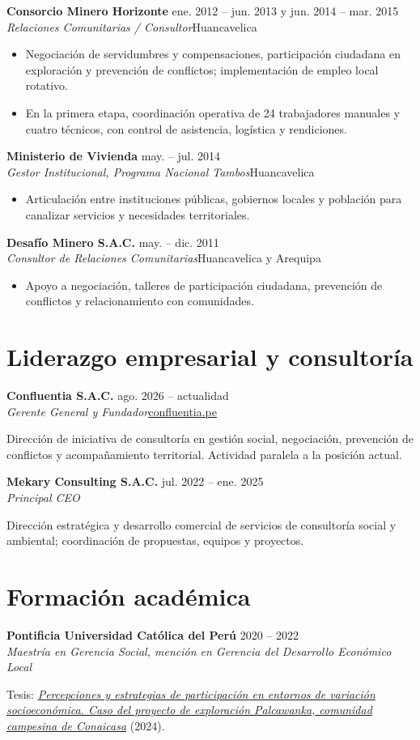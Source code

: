\documentclass[10pt,a4paper]{article}
\newcommand{\trabajo}[4]{%
  \vspace{5pt}\textbf{#1} \hfill {\small\color{muted}#3}\\
  {\color{teal}\itshape #2}\hfill{\small\color{muted}#4}\par\vspace{1pt}}
\begin{document}
\trabajo{Consorcio Minero Horizonte}{Relaciones Comunitarias / Consultor}{ene. 2012 – jun. 2013 y jun. 2014 – mar. 2015}{Huancavelica}
\begin{itemize}
  \item Negociación de servidumbres y compensaciones, participación ciudadana en exploración y prevención de conflictos; implementación de empleo local rotativo.
  \item En la primera etapa, coordinación operativa de 24 trabajadores manuales y cuatro técnicos, con control de asistencia, logística y rendiciones.
\end{itemize}

\trabajo{Ministerio de Vivienda}{Gestor Institucional, Programa Nacional Tambos}{may. – jul. 2014}{Huancavelica}
\begin{itemize}
  \item Articulación entre instituciones públicas, gobiernos locales y población para canalizar servicios y necesidades territoriales.
\end{itemize}

\trabajo{Desafío Minero S.A.C.}{Consultor de Relaciones Comunitarias}{may. – dic. 2011}{Huancavelica y Arequipa}
\begin{itemize}
  \item Apoyo a negociación, talleres de participación ciudadana, prevención de conflictos y relacionamiento con comunidades.
\end{itemize}

\section{Liderazgo empresarial y consultoría}
\trabajo{Confluentia S.A.C.}{Gerente General y Fundador}{ago. 2026 – actualidad}{\href{https://www.confluentia.pe}{confluentia.pe}}
Dirección de iniciativa de consultoría en gestión social, negociación, prevención de conflictos y acompañamiento territorial. Actividad paralela a la posición actual.

\trabajo{Mekary Consulting S.A.C.}{Principal CEO}{jul. 2022 – ene. 2025}{}
Dirección estratégica y desarrollo comercial de servicios de consultoría social y ambiental; coordinación de propuestas, equipos y proyectos.

\section{Formación académica}
\trabajo{Pontificia Universidad Católica del Perú}{Maestría en Gerencia Social, mención en Gerencia del Desarrollo Económico Local}{2020 – 2022}{}
Tesis: \href{https://hdl.handle.net/20.500.12404/28120}{\itshape Percepciones y estrategias de participación en entornos de variación socioeconómica. Caso del proyecto de exploración Palcawanka, comunidad campesina de Conaicasa} (2024).
\end{document}
